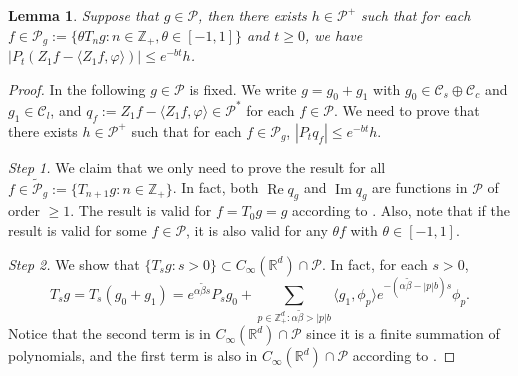\documentclass[12pt,a4paper]{amsart}
\theoremstyle{plain}
\newtheorem{lem}[thm]{Lemma}
\theoremstyle{definition}
\numberwithin{equation}{section}
\begin{document}
\begin{lem}
  \label{lem:P:R}
  Suppose that $g \in \mathcal P$, then there exists $h \in \mathcal P^+$ such that for each $ f \in \mathcal P_g := \{\theta T_n g: n \in \mathbb Z_+, \theta \in [-1,1]\} $ and $t\geq 0$, we have $ | P_t (Z_1 f - \langle Z_1 f, \varphi \rangle )| \leq e^{-bt} h$.
\end{lem}
\begin{proof}
  In the following $g \in \mathcal P$ is fixed. We write  $g = g_0 + g_1$ with $g_0 \in \mathcal C_s \oplus \mathcal C_c$ and $g_1 \in \mathcal C_l$,  and $q_f:=Z_1f - \langle Z_1f, \varphi \rangle\in \mathcal P^*$ for each $f\in \mathcal P$. 
  We need to prove that there exists $h \in \mathcal P^+$ such that for each $f\in \mathcal P_g$, $|P_tq_f| \leq e^{-bt} h$.

  \emph{Step 1.} We claim  that we only need to prove the result for all
  $f \in \widetilde{\mathcal P}_g:= \{T_{n+1} g : n \in \mathbb Z_+\}$.
  In fact, both $\operatorname{Re} q_g$ and $\operatorname{Im} q_g$ are functions in $\mathcal P$ of order $\geq 1$.
  The result is valid for $f = T_0 g = g$ according to \cite[Fact 1.2]{MarksMilos2018CLT}.
  Also, note that if the result is valid for some $f \in \mathcal P$, it is also valid for any $\theta f$ with $\theta \in [-1,1]$.


  \emph{Step 2.} We show that $\{T_s g: s> 0\} \subset C_\infty (\mathbb R^d) \cap \mathcal P$.
  In fact, for each $s > 0$,
  \[
    T_s g
    = T_s (g_0 + g_1)
    = e^{\alpha \tilde \beta s}P_s g_0 + \sum_{p \in \mathbb Z_+^d: \alpha \tilde \beta > |p|b} \langle g_1, \phi_p \rangle e^{-(\alpha \tilde \beta - |p|b)s} \phi_p.
  \]
  Notice that the second term is in $C_\infty(\mathbb R^d)\cap \mathcal P$ since it is a finite summation of polynomials, and the first term is also in $C_\infty (\mathbb R^d) \cap \mathcal P$ according to \cite[Fact 1.1]{MarksMilos2018CLT}.


\end{proof}
\end{document}
